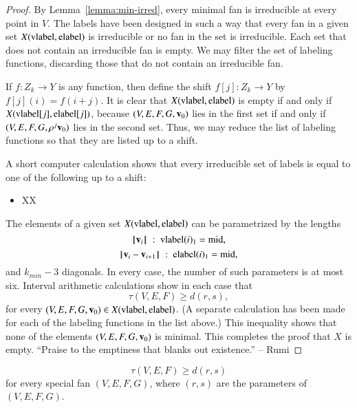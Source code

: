 \begin{proof}
By Lemma~\ref{lemma:min-irred}, every minimal fan is irreducible at every point in $V$.
The labels have been designed in such a way that every fan in a given set
$X({\operatorname{vlabel}},{\operatorname{elabel}})$ is irreducible or no fan in the set is irreducible.
Each set that does not contain an irreducible fan is empty.  We may filter the
set of labeling functions, discarding those that do not contain an irreducible fan.

If $f:Z_k\to Y$ is any function, then define the shift $f[j]:Z_k\to Y$ by
$f[j](i) = f(i+j)$.  It is clear that $X({\operatorname{vlabel}},{\operatorname{elabel}})$ is empty
if and only if $X({\operatorname{vlabel}}[j],{\operatorname{elabel}}[j])$, because $(V,E,F,G,{\mathbf v}_0)$ lies
in the first set if and only if $(V,E,F,G,\rho^j{\mathbf v}_0)$ lies in the second set.  Thus,
we may reduce the list of labeling functions so that they are listed up to a shift.

A short computer calculation shows that every irreducible set of labels is equal
to one of the following up to a shift:
\begin{itemize}
\item XX
\end{itemize}

The elements of a given set $X({\operatorname{vlabel}},{\operatorname{elabel}})$ can be parametrized
by the lengths 
$${{\hskip0.1em|\hskip-0.15em|\hskip0.1em}{\mathbf v}_i{\hskip0.1em|\hskip-0.15em|\hskip0.1em}} \ :\  {\operatorname{vlabel}}(i)_1 = {\operatorname{mid}},$$
$${\hskip0.1em|\hskip-0.15em|\hskip0.1em}{\mathbf v}_i - {\mathbf v}_{i+1}{\hskip0.1em|\hskip-0.15em|\hskip0.1em} \ :\  {\operatorname{elabel}}(i)_1 = {\operatorname{mid}},$$
and $k_{min}-3$ diagonals.  In every case, the number of such parameters is
at most six.    Interval arithmetic calculations %
show in each case that
$$
\tau(V,E,F) \ge d(r,s),
$$
for every $(V,E,F,G,{\mathbf v}_0)\in X({\operatorname{vlabel}},{\operatorname{elabel}})$.  (A separate calculation
has been made for each of the labeling functions in the list above.)
This inequality shows that none of the elements $(V,E,F,G,{\mathbf v}_0)$ is minimal.
This completes the proof that $X$ is empty.
 ``Praise to the emptiness that blanks out existence.'' -- Rumi %
\end{proof}

\begin{corollary}\label{lemma:empty-d}
$$
\tau(V,E,F) \ge d (r,s)
$$
for every special fan $(V,E,F,G)$, where $(r,s)$ are the parameters of $(V,E,F,G)$.
\end{corollary}


